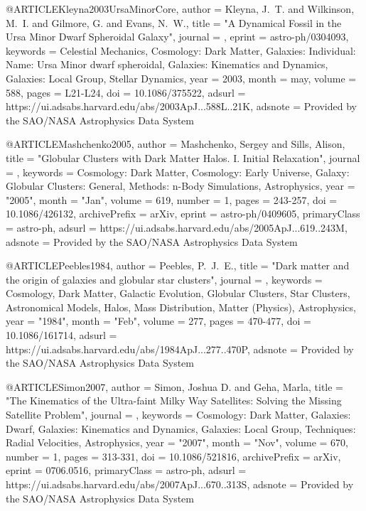 \documentclass[apj]{emulateapj}
\begin{document}
{{@ARTICLE{Kleyna2003UrsaMinorCore,
   author = {{Kleyna}, J.~T. and {Wilkinson}, M.~I. and {Gilmore}, G. and 
	{Evans}, N.~W.},
    title = "{A Dynamical Fossil in the Ursa Minor Dwarf Spheroidal Galaxy}",
  journal = {\apjl},
   eprint = {astro-ph/0304093},
 keywords = {Celestial Mechanics, Cosmology: Dark Matter, Galaxies: Individual: Name: Ursa Minor dwarf spheroidal, Galaxies: Kinematics and Dynamics, Galaxies: Local Group, Stellar Dynamics},
     year = 2003,
    month = may,
   volume = 588,
    pages = {L21-L24},
      doi = {10.1086/375522},
   adsurl = {https://ui.adsabs.harvard.edu/abs/2003ApJ...588L..21K},
  adsnote = {Provided by the SAO/NASA Astrophysics Data System}
}



@ARTICLE{Mashchenko2005,
       author = {{Mashchenko}, Sergey and {Sills}, Alison},
        title = "{Globular Clusters with Dark Matter Halos. I. Initial Relaxation}",
      journal = {\apj},
     keywords = {Cosmology: Dark Matter, Cosmology: Early Universe, Galaxy: Globular Clusters: General, Methods: n-Body Simulations, Astrophysics},
         year = "2005",
        month = "Jan",
       volume = {619},
       number = {1},
        pages = {243-257},
          doi = {10.1086/426132},
archivePrefix = {arXiv},
       eprint = {astro-ph/0409605},
 primaryClass = {astro-ph},
       adsurl = {https://ui.adsabs.harvard.edu/abs/2005ApJ...619..243M},
      adsnote = {Provided by the SAO/NASA Astrophysics Data System}
}




@ARTICLE{Peebles1984,
       author = {{Peebles}, P.~J.~E.},
        title = "{Dark matter and the origin of galaxies and globular star clusters}",
      journal = {\apj},
     keywords = {Cosmology, Dark Matter, Galactic Evolution, Globular Clusters, Star Clusters, Astronomical Models, Halos, Mass Distribution, Matter (Physics), Astrophysics},
         year = "1984",
        month = "Feb",
       volume = {277},
        pages = {470-477},
          doi = {10.1086/161714},
       adsurl = {https://ui.adsabs.harvard.edu/abs/1984ApJ...277..470P},
      adsnote = {Provided by the SAO/NASA Astrophysics Data System}
}



@ARTICLE{Simon2007,
       author = {{Simon}, Joshua D. and {Geha}, Marla},
        title = "{The Kinematics of the Ultra-faint Milky Way Satellites: Solving the Missing Satellite Problem}",
      journal = {\apj},
     keywords = {Cosmology: Dark Matter, Galaxies: Dwarf, Galaxies: Kinematics and Dynamics, Galaxies: Local Group, Techniques: Radial Velocities, Astrophysics},
         year = "2007",
        month = "Nov",
       volume = {670},
       number = {1},
        pages = {313-331},
          doi = {10.1086/521816},
archivePrefix = {arXiv},
       eprint = {0706.0516},
 primaryClass = {astro-ph},
       adsurl = {https://ui.adsabs.harvard.edu/abs/2007ApJ...670..313S},
      adsnote = {Provided by the SAO/NASA Astrophysics Data System}
}


}}
\end{document}
